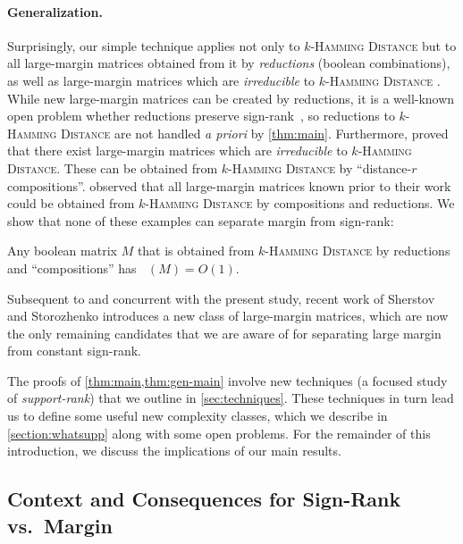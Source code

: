 \documentclass[conference]{IEEEtran}
\DeclareMathOperator{\signrank}{rank_\pm}
\begin{document}
\paragraph{Generalization.}
Surprisingly, our simple technique applies not only to \textsc{$k$-Hamming
Distance} but to all large-margin matrices obtained from it by \emph{reductions} (\ie boolean combinations), as well as large-margin matrices which are
\emph{irreducible} to \textsc{$k$-Hamming Distance} \cite{FGHH25}. While new
large-margin matrices can be created by reductions, it is a well-known open
problem whether reductions preserve sign-rank~\cite{BMT21,HHPTZ22}, so
reductions to \textsc{$k$-Hamming Distance} are not handled \emph{a
priori} by \cref{thm:main}. Furthermore, \cite{FGHH25} proved that there exist
large-margin matrices which are \emph{irreducible} to \textsc{$k$-Hamming
Distance}. These can be obtained from \textsc{$k$-Hamming Distance} by
``distance-$r$ compositions''\!. \cite{FGHH25} observed that all large-margin
matrices known prior to their work could be obtained from \textsc{$k$-Hamming
Distance} by compositions and reductions. We show that none of these examples can
separate margin from sign-rank:

\begin{theorem}
\label{thm:gen-main}
    Any boolean matrix $M$ that is obtained from \textsc{$k$-Hamming Distance} by reductions and
    ``compositions'' has $\signrank(M) = O(1)$.
\end{theorem}
Subsequent to \cite{FGHH25} and concurrent with the present study, recent work
of Sherstov and Storozhenko \cite{SS24} introduces a new class of large-margin
matrices, which are now the only remaining candidates that we are aware of for
separating large margin from constant sign-rank.

The proofs of \cref{thm:main,thm:gen-main} involve new techniques (a focused
study of \emph{support-rank}) that we outline in \cref{sec:techniques}. These
techniques in turn lead us to define some useful new complexity classes, which
we describe in \cref{section:whatsupp} along with some open problems. For the
remainder of this introduction, we discuss the implications of our main results.


\subsection{Context and Consequences for Sign-Rank vs.\ Margin}
\label{section:signrank-vs-margin}
\end{document}
